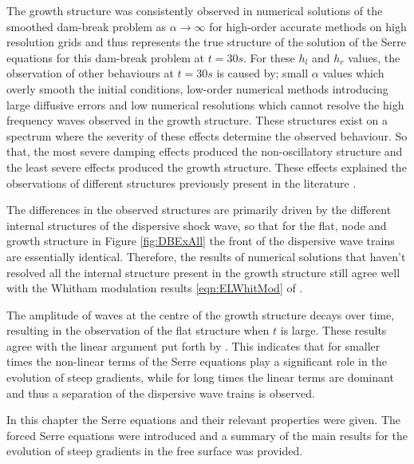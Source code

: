 The growth structure was consistently observed in numerical solutions of the smoothed dam-break problem as $\alpha \rightarrow \infty$ for high-order accurate methods on high resolution grids and thus represents the true structure of the solution of the Serre equations for this dam-break problem at $t=30s$. For these $h_l$ and $h_r$ values, the observation of other behaviours at $t=30s$ is caused by; small $\alpha$ values which overly smooth the initial conditions, low-order numerical methods introducing large diffusive errors and low numerical resolutions which cannot resolve the high frequency waves observed in the growth structure. These structures exist on a spectrum  where the severity of these effects determine the observed behaviour. So that, the most severe damping effects produced the non-oscillatory structure and the least severe effects produced the growth structure. These effects explained the observations of different structures previously present in the literature \cite{El-etal-2006,Hank-etal-2010-2034,Mitsotakis-etal-2014,Mitsotakis-etal-2017,doCarmo-etal-2018-404}. 

The differences in the observed structures are primarily driven by the different internal structures of the dispersive shock wave, so that for the flat, node and growth structure in Figure \ref{fig:DBExAll} the front of the dispersive wave trains are essentially identical. Therefore, the results of numerical solutions that haven't resolved all the internal structure present in the growth structure still agree well with the Whitham modulation results \eqref{eqn:ELWhitMod} of \citet{El-etal-2006}.

The amplitude of waves at the centre of the growth structure decays over time, resulting in the observation of the flat structure  when $t$ is large. These results agree with the linear argument put forth by \citet{Dougalis-etal-2007}. This indicates that for smaller times the non-linear terms of the Serre equations play a significant role in the evolution of steep gradients, while for long times the linear terms are dominant and thus a separation of the dispersive wave trains is observed. 

\medskip

In this chapter the Serre equations and their relevant properties were given. The forced Serre equations were introduced and a summary of the main results for the evolution of steep gradients in the free surface was provided. 
